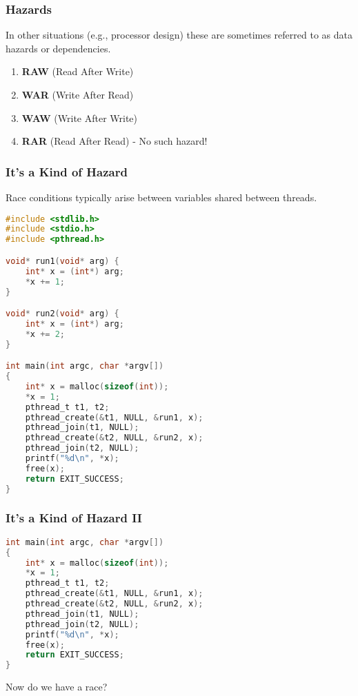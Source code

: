 \begin{frame}
\frametitle{Hazards}

In other situations (e.g., processor design) these are sometimes referred to as data hazards or dependencies. 

\begin{enumerate}
	\item \textbf{RAW} (Read After Write)	
	\item \textbf{WAR} (Write After Read)
	\item \textbf{WAW} (Write After Write)
	\item \textbf{RAR} (Read After Read) - No such hazard! 
\end{enumerate}


\end{frame}



\begin{frame}[fragile]
\frametitle{It's a Kind of Hazard}
Race conditions typically arise between variables shared
between threads.
{\scriptsize
\begin{lstlisting}[language=C]
#include <stdlib.h>
#include <stdio.h>
#include <pthread.h>

void* run1(void* arg) {
    int* x = (int*) arg;
    *x += 1;
}

void* run2(void* arg) {
    int* x = (int*) arg;
    *x += 2;
}

int main(int argc, char *argv[])
{
    int* x = malloc(sizeof(int));
    *x = 1;
    pthread_t t1, t2;
    pthread_create(&t1, NULL, &run1, x);
    pthread_join(t1, NULL);
    pthread_create(&t2, NULL, &run2, x);
    pthread_join(t2, NULL);
    printf("%d\n", *x);
    free(x);
    return EXIT_SUCCESS;
}
\end{lstlisting}
}

\end{frame}



\begin{frame}[fragile]
\frametitle{It's a Kind of Hazard II}

{\scriptsize
\begin{lstlisting}[language=C]
int main(int argc, char *argv[])
{
    int* x = malloc(sizeof(int));
    *x = 1;
    pthread_t t1, t2;
    pthread_create(&t1, NULL, &run1, x);
    pthread_create(&t2, NULL, &run2, x);
    pthread_join(t1, NULL);
    pthread_join(t2, NULL);
    printf("%d\n", *x);
    free(x);
    return EXIT_SUCCESS;
}
\end{lstlisting}
}

Now do we have a race?

\end{frame}



